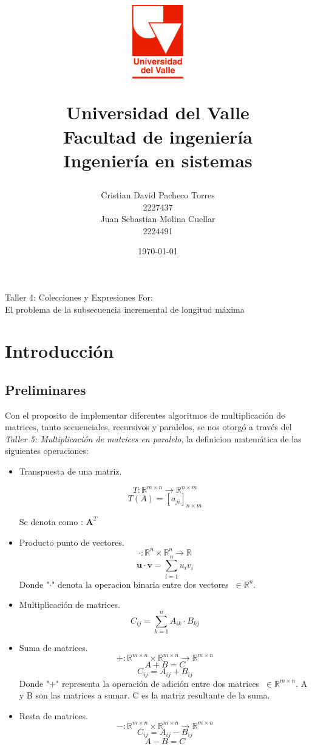 \documentclass[12pt, a4paper]{article}
\title{
  \begin{figure}[th]
    \centering
    \includegraphics[width=0.2\textwidth]{Univalle}
  \end{figure}
  \textbf{Universidad del Valle
    \\{\Large Facultad de ingeniería}
  \\{\large Ingeniería en sistemas}}}
\author{Cristian David Pacheco Torres
  \\ 2227437
  \\ Juan Sebastian Molina Cuellar
  \\ 2224491}
\date{\today}
\begin{document}
\maketitle
{Taller 4: Colecciones y Expresiones For:
\\ El problema de la subsecuencia incremental de longitud máxima}
\newpage{}

\tableofcontents
\newpage{}
\section{Introducción}
\subsection{Preliminares}
Con el proposito de implementar diferentes algoritmos de multiplicación de matrices, tanto secuenciales, recursivos y paralelos, se nos otorgó a través del \textit{Taller 5: Multiplicación de matrices en paralelo}, la definicion matemática de las siguientes operaciones:
\begin{itemize}
  \item Transpuesta de una matriz.

    \[T: \mathbb{R}^{m \times n} \to \mathbb{R}^{n \times m} \label{eq:transpuesta} \]
  \begin{equation}
    T(A) = [a_{ji}]_{n \times m}
  \end{equation}
  
  Se denota como : $\textbf{A}^T$
  \item Producto punto de vectores.
\[
    \cdot: \mathbb{R}^n \times \mathbb{R}^n \to \mathbb{R}
\]
  \begin{equation}
    \mathbf{u} \cdot \mathbf{v} = \sum_{i=1}^{n} u_i v_i
  \end{equation}
  Donde  "$\cdot$" denota la operacion binaria entre dos vectores $~\in \mathbb{R}^n$.
  \item Multiplicación de matrices.
  \begin{equation}
    C_{ij} = \sum_{k=1}^{n} A_{ik} \cdot B_{kj}
  \end{equation}
  \item Suma de matrices.
\[
    +: \mathbb{R}^{m \times n} \times \mathbb{R}^{m \times n} \to \mathbb{R}^{m \times n}
\]
\[
    A + B = C
\]
  \begin{equation}
    C_{ij} = A_{ij} + B_{ij}
  \end{equation}
  Donde "$+$" representa la operación de adición entre dos matrices $~\in \mathbb{R}^{m \times n}$.
  A y B son las matrices a sumar.
  C es la matriz resultante de la suma.
  \item Resta de matrices.
\[
    -: \mathbb{R}^{m \times n} \times \mathbb{R}^{m \times n} \to \mathbb{R}^{m \times n}
\]
  \begin{equation}
    C_{ij} = A_{ij} - B_{ij}
  \end{equation}
\[
    A - B = C
\]
\end{itemize}
\end{document}
